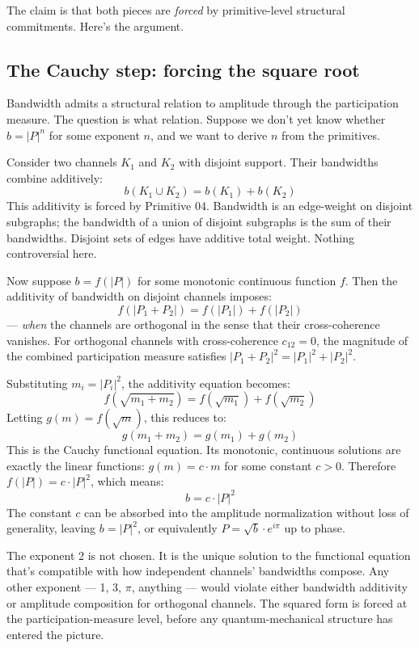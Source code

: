 \documentclass[11pt,a4paper]{article}
\begin{document}
The claim is that both pieces are \emph{forced} by primitive-level structural commitments. Here's the argument.

\subsection{The Cauchy step: forcing the square root}

Bandwidth admits a structural relation to amplitude through the participation measure. The question is what relation. Suppose we don't yet know whether $b = |P|^n$ for some exponent $n$, and we want to derive $n$ from the primitives.

Consider two channels $K_1$ and $K_2$ with disjoint support. Their bandwidths combine additively:
\[
b(K_1 \cup K_2) = b(K_1) + b(K_2)
\]
This additivity is forced by Primitive 04. Bandwidth is an edge-weight on disjoint subgraphs; the bandwidth of a union of disjoint subgraphs is the sum of their bandwidths. Disjoint sets of edges have additive total weight. Nothing controversial here.

Now suppose $b = f(|P|)$ for some monotonic continuous function $f$. Then the additivity of bandwidth on disjoint channels imposes:
\[
f(|P_1 + P_2|) = f(|P_1|) + f(|P_2|)
\]
--- \emph{when} the channels are orthogonal in the sense that their cross-coherence vanishes. For orthogonal channels with cross-coherence $c_{12} = 0$, the magnitude of the combined participation measure satisfies $|P_1 + P_2|^2 = |P_1|^2 + |P_2|^2$.

Substituting $m_i = |P_i|^2$, the additivity equation becomes:
\[
f(\sqrt{m_1 + m_2}) = f(\sqrt{m_1}) + f(\sqrt{m_2})
\]
Letting $g(m) = f(\sqrt{m})$, this reduces to:
\[
g(m_1 + m_2) = g(m_1) + g(m_2)
\]
This is the Cauchy functional equation. Its monotonic, continuous solutions are exactly the linear functions: $g(m) = c \cdot m$ for some constant $c > 0$. Therefore $f(|P|) = c\cdot |P|^2$, which means:
\[
b = c \cdot |P|^{2}
\]
The constant $c$ can be absorbed into the amplitude normalization without loss of generality, leaving $b = |P|^2$, or equivalently $P = \sqrt{b}\cdot e^{i\pi}$ up to phase.

The exponent 2 is not chosen. It is the unique solution to the functional equation that's compatible with how independent channels' bandwidths compose. Any other exponent --- 1, 3, $\pi$, anything --- would violate either bandwidth additivity or amplitude composition for orthogonal channels. The squared form is forced at the participation-measure level, before any quantum-mechanical structure has entered the picture.
\end{document}
